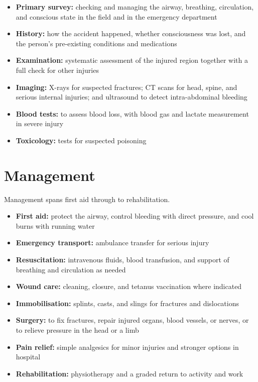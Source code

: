 \begin{itemize}
    \item \textbf{Primary survey:} checking and managing the airway, breathing, circulation, and conscious state in the field and in the emergency department
    \item \textbf{History:} how the accident happened, whether consciousness was lost, and the person's pre-existing conditions and medications
    \item \textbf{Examination:} systematic assessment of the injured region together with a full check for other injuries
    \item \textbf{Imaging:} X-rays for suspected fractures; CT scans for head, spine, and serious internal injuries; and ultrasound to detect intra-abdominal bleeding
    \item \textbf{Blood tests:} to assess blood loss, with blood gas and lactate measurement in severe injury
    \item \textbf{Toxicology:} tests for suspected poisoning
\end{itemize}

\section*{Management}
Management spans first aid through to rehabilitation.

\begin{itemize}
    \item \textbf{First aid:} protect the airway, control bleeding with direct pressure, and cool burns with running water
    \item \textbf{Emergency transport:} ambulance transfer for serious injury
    \item \textbf{Resuscitation:} intravenous fluids, blood transfusion, and support of breathing and circulation as needed
    \item \textbf{Wound care:} cleaning, closure, and tetanus vaccination where indicated
    \item \textbf{Immobilisation:} splints, casts, and slings for fractures and dislocations
    \item \textbf{Surgery:} to fix fractures, repair injured organs, blood vessels, or nerves, or to relieve pressure in the head or a limb
    \item \textbf{Pain relief:} simple analgesics for minor injuries and stronger options in hospital
    \item \textbf{Rehabilitation:} physiotherapy and a graded return to activity and work
\end{itemize}

